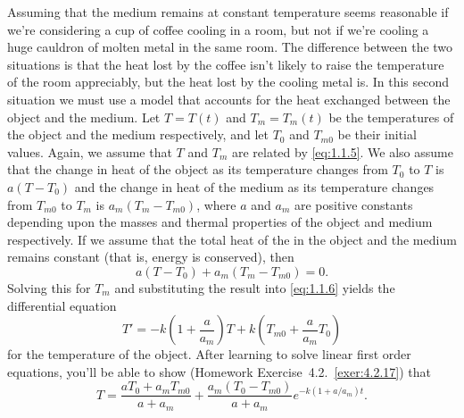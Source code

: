 \documentclass{ximera}
\begin{document}
%    

Assuming that the medium remains at constant temperature seems
reasonable if we're considering a cup of coffee cooling in a room, but
 not if we're cooling a huge cauldron of molten
metal in the same room. The difference between the two situations is
that the heat lost by the coffee isn't likely to raise the
temperature of the room appreciably, but the heat lost by the
cooling metal is. In this second situation we must use a model that
accounts for the heat exchanged between the object and the medium. Let
$T=T(t)$ and $T_m=T_m(t)$ be the temperatures of the object and the
medium respectively, and let $T_0$ and $T_{m0}$ be their initial
values. Again, we assume that $T$ and $T_m$ are related by
\eqref{eq:1.1.5}. We also assume that the change in heat of
the object as its temperature changes from $T_0$ to $T$ is $a(T-T_0)$
and  the change in heat of the medium as its temperature changes
from $T_{m0}$ to $T_m$ is $a_m(T_m-T_{m0})$, where $a$ and $a_m$ are
positive constants depending upon the masses and thermal properties of
the object and medium respectively. If we assume that the total heat
of the in the object and the medium remains constant
(that is, energy is conserved), then
$$
a(T-T_0)+a_m(T_m-T_{m0})=0.
$$
Solving this for  $T_m$  and substituting the result into
\eqref{eq:1.1.6} yields the differential equation
$$
T'=-k\left(1+\frac{a}{a_m}\right)T
+k\left(T_{m0}+\frac{a}{a_m}T_0\right)
$$
for the temperature of the object.  After learning to solve linear
first order  equations, you'll be able to show
(Homework Exercise~4.2.~\hspace*{-3pt}\ref{exer:4.2.17}) that
$$
T=\frac{aT_0+a_mT_{m0}}{
a+a_m}+\frac{a_m(T_0-T_{m0})}{a+a_m}e^{-k(1+a/a_m)t}.
$$
\end{document}
